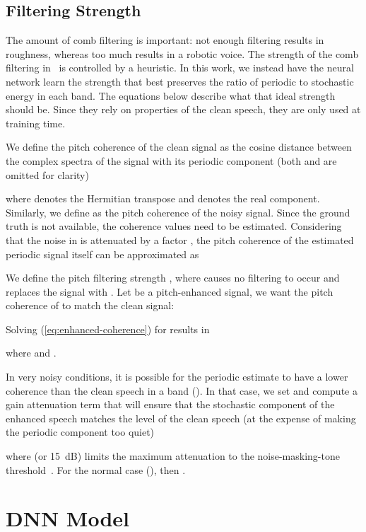 \documentclass[english]{article}
\begin{document}
\subsection{Filtering Strength}

\label{sub:filtering-strength}

The amount of comb filtering is important: not enough filtering results
in roughness, whereas too much results in a robotic voice. The strength
of the comb filtering in~\cite{valin2018rnnoise} is controlled by
a heuristic. In this work, we instead have the neural network learn
the strength that best preserves the ratio of periodic to stochastic
energy in each band. The equations below describe what that ideal
strength should be. Since they rely on properties of the clean speech,
they are only used at training time.

We define the pitch coherence  of the clean
signal as the cosine distance between the complex spectra of the signal
with its periodic component (both  and  are omitted for
clarity) 

where  denotes the Hermitian transpose and 
denotes the real component. Similarly, we define  as the pitch
coherence of the noisy signal. Since the ground truth 
is not available, the coherence values need to be estimated. Considering
that the noise in  is attenuated by a factor ,
the pitch coherence of the estimated periodic signal 
itself can be approximated as



We define the pitch filtering strength ,
where  causes no filtering to occur and  replaces the
signal with . Let 
be a pitch-enhanced signal, we want the pitch coherence of 
to match the clean signal:

Solving (\ref{eq:enhanced-coherence}) for  results in

where  and .

In very noisy conditions, it is possible for the periodic estimate
 to have a lower coherence than the clean speech
in a band (). In that case, we set  and
compute a gain attenuation term that will ensure that the stochastic
component of the enhanced speech matches the level of the clean speech
(at the expense of making the periodic component too quiet)

where  (or 15~dB) limits the maximum attenuation to
the noise-masking-tone threshold~\cite{painter2000perceptual}. For
the normal case (), then .


\section{DNN Model}
\end{document}
